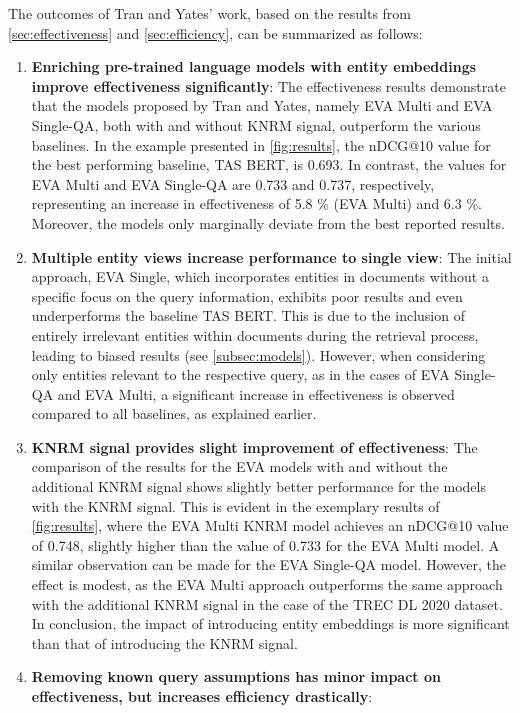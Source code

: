 The outcomes of Tran and Yates' work, based on the results from \autoref{sec:effectiveness} and \autoref{sec:efficiency}, can be summarized as follows:
\begin{enumerate}
    \item \textbf{Enriching pre-trained language models with entity embeddings improve effectiveness significantly}:
    The effectiveness results demonstrate that the models proposed by Tran and Yates, namely EVA Multi and EVA Single-QA, both with and without KNRM signal, outperform the various baselines. In the example presented in \autoref{fig:results}, the nDCG@10 value for the best performing baseline, TAS BERT, is 0.693. In contrast, the values for EVA Multi and EVA Single-QA are 0.733 and 0.737, respectively, representing an increase in effectiveness of 5.8 \% (EVA Multi) and 6.3 \%. Moreover, the models only marginally deviate from the best reported results.
    \item \textbf{Multiple entity views increase performance to single view}:
    The initial approach, EVA Single, which incorporates entities in documents without a specific focus on the query information, exhibits poor results and even underperforms the baseline TAS BERT. This is due to the inclusion of entirely irrelevant entities within documents during the retrieval process, leading to biased results (see \autoref{subsec:models}). However, when considering only entities relevant to the respective query, as in the cases of EVA Single-QA and EVA Multi, a significant increase in effectiveness is observed compared to all baselines, as explained earlier.
    \item \textbf{KNRM signal provides slight improvement of effectiveness}:
    The comparison of the results for the EVA models with and without the additional KNRM signal shows slightly better performance for the models with the KNRM signal. This is evident in the exemplary results of \autoref{fig:results}, where the EVA Multi KNRM model achieves an nDCG@10 value of 0.748, slightly higher than the value of 0.733 for the EVA Multi model. A similar observation can be made for the EVA Single-QA model. However, the effect is modest, as the EVA Multi approach outperforms the same approach with the additional KNRM signal in the case of the TREC DL 2020 dataset. In conclusion, the impact of introducing entity embeddings is more significant than that of introducing the KNRM signal.
    \item \textbf{Removing known query assumptions has minor impact on effectiveness, but increases efficiency drastically}:

\end{enumerate}
